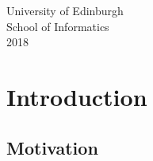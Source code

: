 \documentclass[12pt]{article}
\begin{document}
\begin{titlepage}
{\large University of Edinburgh}\\
{\large School of Informatics}\\
{\large 2018}\\[2cm] %

\vfill %

\end{titlepage}

\section{Introduction}
\subsection{Motivation}
\end{document}
